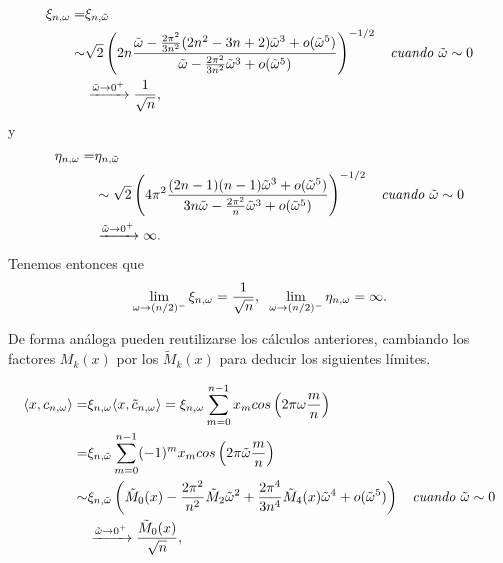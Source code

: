 \begin{align*}
\xi_{n, \omega} = &
\xi_{n, \tilde{\omega}} \\
\sim &
\sqrt{2} 
\left(
2n
\frac{                                                                                                                                          
\tilde{\omega} - \frac{2\pi^{2}}{3n^{2}}(2n^2-3n+2)\tilde{\omega}^{3} 
+ o(\tilde{\omega}^{5})
}{
\tilde{\omega} -
\frac{2 \pi^{2}}{3 n^{2}} \tilde{\omega}^{3} + o(\tilde{\omega}^{5})
}
\right)^{-1/2}
\hspace{0.2cm} \textit{ cuando } \tilde{\omega} \sim 0
\\ &
\xrightarrow{\tilde{\omega} \rightarrow 0^{+}} 
\frac{1}{\sqrt{n}},
\end{align*}
y 
\begin{align*}
\eta_{n, \omega} = &
\eta_{n, \tilde{\omega}} \\
& \sim 
\sqrt{2} 
\left(
4\pi^{2}
\frac{
(2n-1)(n-1)\tilde{\omega}^{3} + o(\tilde{\omega}^{5})
}{
3 n \tilde{\omega} -
\frac{2 \pi^{2}}{n} \tilde{\omega}^{3} + o(\tilde{\omega}^{5})
}
\right)^{-1/2}  
\hspace{0.2cm} \textit{ cuando } \tilde{\omega} \sim 0
\\  &
\xrightarrow{\tilde{\omega} \rightarrow 0^{+}} 
\infty.
\end{align*}
Tenemos entonces que
\[
\lim\limits_{\omega \rightarrow (n/2)^{-}}{
\xi_{n, \omega}} = \frac{1}{\sqrt{n}},
\hspace{0.2cm}
\lim\limits_{\omega \rightarrow (n/2)^{-}}{
\eta_{n, \omega}} = \infty.
\]

De forma análoga pueden reutilizarse los cálculos anteriores,
cambiando los factores $M_{k}(x)$ por los $\tilde{M}_{k}(x)$
para deducir los siguientes límites.


\begin{align*}
\langle x,
c_{n, \omega}
\rangle = & 
\xi_{n, \omega} \langle x,
\tilde{c}_{n, \omega}
\rangle =  
\xi_{n, \omega} \sum\limits_{m=0}^{n-1}x_{m} cos \left(
2 \pi \omega \frac{m}{n}
\right)
\\
= &  
\xi_{n, \tilde{\omega}} \sum\limits_{m=0}^{n-1}(-1)^{m}x_{m} cos \left(
2 \pi \tilde{\omega} \frac{m}{n}
\right)\\
\sim &
\xi_{n, \tilde{\omega}} 
\left(
\tilde{M}_{0}(x) - \frac{2 \pi^{2}}{n^{2}}\tilde{M}_{2} \tilde{\omega}^{2} 
+ \frac{2 \pi^{4}}{3n^{4}} \tilde{M}_{4}(x) \tilde{\omega}^{4} + o(\tilde{\omega}^{5})
\right) 
\hspace{0.2cm} \textit{ cuando } \tilde{\omega} \sim 0
\\
& 
\xrightarrow{\tilde{\omega} \rightarrow 0^{+}}
\frac{\tilde{M}_{0}(x)}{\sqrt{n}},
\end{align*}

